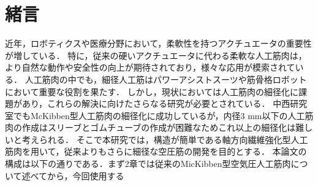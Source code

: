 \newpage
\setcounter{page}{1}
\section{緒言}
近年，ロボティクスや医療分野において，柔軟性を持つアクチュエータの重要性が増している．
特に，従来の硬いアクチュエータに代わる柔軟な人工筋肉は，より自然な動作や安全性の向上が期待されており，様々な応用が模索されている．
人工筋肉の中でも，細径人工筋はパワーアシストスーツや筋骨格ロボットにおいて重要な役割を果たす\cite{1}．
しかし，現状においては人工筋肉の細径化に課題があり，これらの解決に向けたさらなる研究が必要とされている．
中西研究室でもMcKibben型人工筋肉の細径化に成功しているが\cite{2}，内径3 mm以下の人工筋肉の作成はスリーブとゴムチューブの作成が困難なためこれ以上の細径化は難しいと考えられる．
そこで本研究では，構造が簡単である軸方向繊維強化型人工筋肉\cite{3}を用いて，従来よりもさらに細径な空圧筋の開発を目的とする．
本論文の構成は以下の通りである．まず2章では従来のMicKibben型空気圧人工筋肉について述べてから，今回使用する